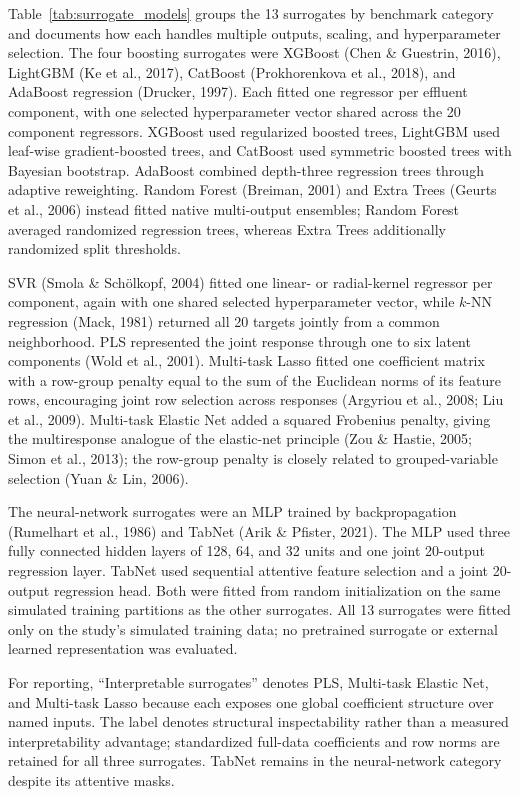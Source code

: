 \documentclass[a4paper,fleqn]{cas-sc}
\begin{document}
Table~\ref{tab:surrogate_models} groups the 13 surrogates by benchmark category and documents how each handles multiple outputs, scaling, and hyperparameter selection. The four boosting surrogates were XGBoost (Chen \& Guestrin, 2016), LightGBM (Ke et al., 2017), CatBoost (Prokhorenkova et al., 2018), and AdaBoost regression (Drucker, 1997). Each fitted one regressor per effluent component, with one selected hyperparameter vector shared across the 20 component regressors. XGBoost used regularized boosted trees, LightGBM used leaf-wise gradient-boosted trees, and CatBoost used symmetric boosted trees with Bayesian bootstrap. AdaBoost combined depth-three regression trees through adaptive reweighting. Random Forest (Breiman, 2001) and Extra Trees (Geurts et al., 2006) instead fitted native multi-output ensembles; Random Forest averaged randomized regression trees, whereas Extra Trees additionally randomized split thresholds.

SVR (Smola \& Sch\"olkopf, 2004) fitted one linear- or radial-kernel regressor per component, again with one shared selected hyperparameter vector, while $k$-NN regression (Mack, 1981) returned all 20 targets jointly from a common neighborhood. PLS represented the joint response through one to six latent components (Wold et al., 2001). Multi-task Lasso fitted one coefficient matrix with a row-group penalty equal to the sum of the Euclidean norms of its feature rows, encouraging joint row selection across responses (Argyriou et al., 2008; Liu et al., 2009). Multi-task Elastic Net added a squared Frobenius penalty, giving the multiresponse analogue of the elastic-net principle (Zou \& Hastie, 2005; Simon et al., 2013); the row-group penalty is closely related to grouped-variable selection (Yuan \& Lin, 2006).

The neural-network surrogates were an MLP trained by backpropagation (Rumelhart et al., 1986) and TabNet (Arik \& Pfister, 2021). The MLP used three fully connected hidden layers of 128, 64, and 32 units and one joint 20-output regression layer. TabNet used sequential attentive feature selection and a joint 20-output regression head. Both were fitted from random initialization on the same simulated training partitions as the other surrogates. All 13 surrogates were fitted only on the study's simulated training data; no pretrained surrogate or external learned representation was evaluated.

For reporting, ``Interpretable surrogates'' denotes PLS, Multi-task Elastic Net, and Multi-task Lasso because each exposes one global coefficient structure over named inputs. The label denotes structural inspectability rather than a measured interpretability advantage; standardized full-data coefficients and row norms are retained for all three surrogates. TabNet remains in the neural-network category despite its attentive masks.
\end{document}
